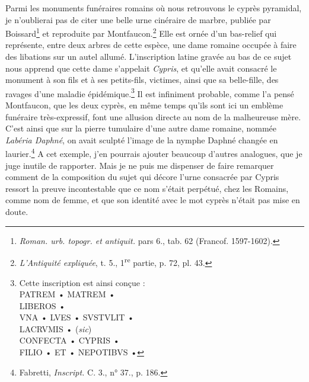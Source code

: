 \documentclass{article}
\begin{document}
Parmi les monuments funéraires romains où nous retrouvons le cyprès pyramidal, je n'oublierai pas de citer une belle urne cinéraire de marbre, publiée par Boissard\footnote{\emph{Roman. urb. topogr. et antiquit.} pars 6., tab. 62 (Francof. 1597-1602).} et reproduite par Montfaucon.\footnote{\emph{L'Antiquité expliquée}, t. 5., 1\textsuperscript{re} partie, p. 72, pl. 43.} Elle est ornée d'un bas-relief qui représente, entre deux arbres de cette espèce, une dame romaine occupée à faire des libations sur un autel allumé. L'inscription latine gravée au bas de ce sujet nous apprend que cette dame s'appelait \emph{Cypris}, et qu'elle avait consacré le monument à son fils et à ses petits-fils, victimes, ainsi que sa belle-fille, des ravages d'une maladie épidémique.\footnote{Cette inscription est ainsi conçue :\\\hspace*{10mm}PATREM • MATREM •\\\hspace*{15mm}LIBEROS •\\\hspace*{10mm}VNA • LVES • SVSTVLIT •\\\hspace*{15mm}LACRVMIS • (\emph{sic})\\\hspace*{10mm}CONFECTA • CYPRIS •\\\hspace*{10mm}FILIO • ET • NEPOTIBVS •} Il est infiniment probable, comme l'a pensé Montfaucon, que les deux cyprès, en même temps qu'ils sont ici un emblème funéraire très-expressif, font une allusion directe au nom de la malheureuse mère. C'est ainsi que sur la pierre tumulaire d'une autre dame romaine, nommée \emph{Labéria Daphné}, on avait sculpté l'image de la nymphe Daphné changée en laurier.\footnote{Fabretti, \emph{Inscript.} C. 3., n° 37., p. 186.} A cet exemple, j'en pourrais ajouter beaucoup d'autres analogues, que je juge inutile de rapporter. Mais je ne puis me dispenser de faire remarquer comment de la composition du sujet qui décore l'urne consacrée par Cypris ressort la preuve incontestable que ce nom s'était perpétué, chez les Romains, comme nom de femme, et que son identité avec le mot cyprès n'était pas mise en doute.
\end{document}
